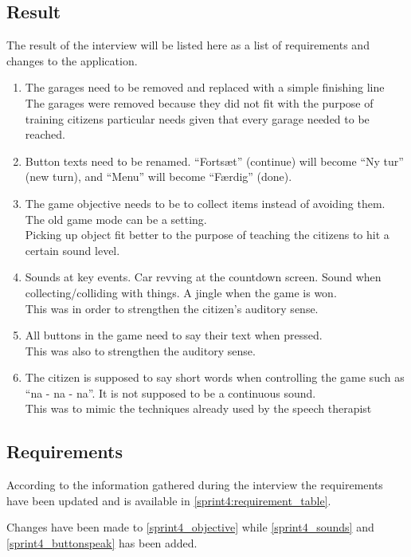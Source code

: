 \subsection{Result}
The result of the interview will be listed here as a list of requirements and changes to the application.

\begin{enumerate}
\item The garages need to be removed and replaced with a simple finishing line\\
The garages were removed because they did not fit with the purpose of training citizens particular needs given that every garage needed to be reached.
\item Button texts need to be renamed. ``Fortsæt'' (continue) will become ``Ny tur'' (new turn), and ``Menu'' will become ``Færdig'' (done).
\item The game objective needs to be to collect items instead of avoiding them. The old game mode can be a setting.\\
Picking up object fit better to the purpose of teaching the citizens to hit a certain sound level.
\item Sounds at key events. Car revving at the countdown screen. Sound when collecting/colliding with things.
A jingle when the game is won.\\
This was in order to strengthen the citizen's auditory sense.
\item All buttons in the game need to say their text when pressed.\\
This was also to strengthen the auditory sense.
\item The citizen is supposed to say short words when controlling the game such as ``na - na - na''. It is not supposed to be a continuous sound.\\
This was to mimic the techniques already used by the speech therapist
\end{enumerate}

\subsection{Requirements}\label{sprint4_req}
According to the information gathered during the interview the requirements have been updated and is available in \cref{sprint4:requirement_table}.

Changes have been made to \cref{sprint4_objective} while \cref{sprint4_sounds} and \cref{sprint4_buttonspeak} has been added.

